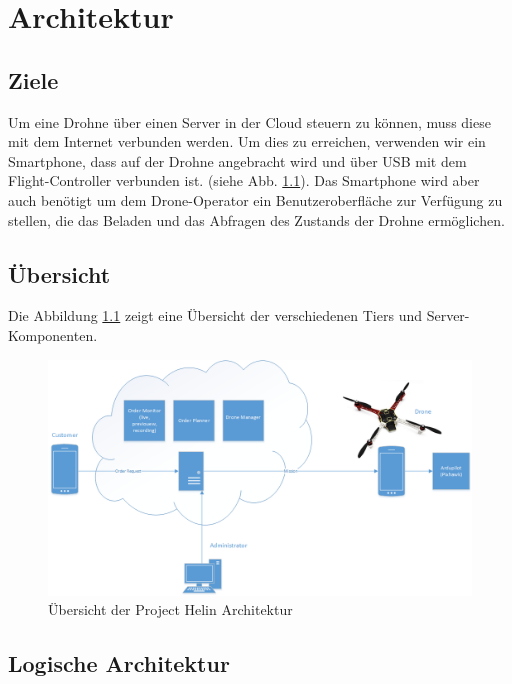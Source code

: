 \chapter{Architektur}

\section{Ziele}

Um eine Drohne über einen Server in der Cloud steuern zu können, muss diese mit dem Internet verbunden werden. Um dies zu erreichen, verwenden wir ein Smartphone, dass auf der Drohne angebracht wird und über USB mit dem Flight-Controller verbunden ist.  (siehe Abb. \ref{fig:architecture-overview}). Das Smartphone wird aber auch benötigt um dem Drone-Operator ein Benutzeroberfläche zur Verfügung zu stellen, die das Beladen und das Abfragen des Zustands der Drohne ermöglichen. \\


\section{Übersicht}

Die Abbildung \ref{fig:architecture-overview} zeigt eine Übersicht der verschiedenen Tiers und Server-Komponenten.

\begin{figure}[h]
	\includegraphics[width=1.0\textwidth]{images/Overview-Diagram.png}
	\caption{Übersicht der Project Helin Architektur }
	\label{fig:architecture-overview}
\end{figure}

\section{Logische Architektur}

